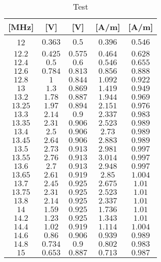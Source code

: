 \documentclass[12pt,a4paper,ngerman]{article}
\begin{document}
\begin{table}[H]
\begin{center}
\begin{tabular}{ |c|c|c|c|c| }
  [MHz] & [V] & [V] & [A/m] & [A/m] \\
  \hline
  12 & $0.363$ & $0.5$ & $0.396$ & $0.546$ \\
  \hline
  $12.2$ & $0.425$ & $0.575$ & $0.464$ & $0.628$ \\
  \hline
  $12.4$ & $0.5$ & $0.6$ & $0.546$ & $0.655$ \\
  \hline
  $12.6$ & $0.784$ & $0.813$ & $0.856$ & $0.888$ \\
    \hline
  $12.8$ & $1$ & $0.844$ & $1.092$ & $0.922$ \\
    \hline
  $13$ & $1.3$ & $0.869$ & $1.419$ & $0.949$ \\
    \hline
  $13.2$ & $1.78$ & $0.887$ & $1.944$ & $0.969$ \\
     \hline
  $13.25$ & $1.97$ & $0.894$ & $2.151$ & $0.976$ \\ 
    \hline
  $13.3$ & $2.14$ & $0.9$ & $2.337$ & $0.983$ \\
    \hline
  $13.35$ & $2.31$ & $0.906$ & $2.523$ & $0.989$ \\
    \hline
  $13.4$ & $2.5$ & $0.906$ & $2.73$ & $0.989$ \\
    \hline
  $13.45$ & $2.64$ & $0.906$ & $2.883$ & $0.989$ \\
    \hline
  $13.5$ & $2.73$ & $0.913$ & $2.981$ & $0.997$ \\
     \hline
  $13.55$ & $2.76$ & $0.913$ & $3.014$ & $0.997$ \\
      \hline
  $13.6$ & $2.7$ & $0.913$ & $2.948$ & $0.997$ \\ 
      \hline
  $13.65$ & $2.61$ & $0.919$ & $2.85$ & $1.004$ \\
      \hline
  $13.7$ & $2.45$ & $0.925$ & $2.675$ & $1.01$ \\
      \hline
  $13.75$ & $2.31$ & $0.925$ & $2.523$ & $1.01$ \\
      \hline
  $13.8$ & $2.14$ & $0.925$ & $2.337$ & $1.01$ \\
      \hline
  $14$ & $1.59$ & $0.925$ & $1.736$ & $1.01$ \\
      \hline
  $14.2$ & $1.23$ & $0.925$ & $1.343$ & $1.01$ \\
      \hline
  $14.4$ & $1.02$ & $0.919$ & $1.114$ & $1.004$ \\
      \hline
  $14.6$ & $0.86$ & $0.906$ & $0.939$ & $0.989$ \\
      \hline
  $14.8$ & $0.734$ & $0.9$ & $0.802$ & $0.983$ \\
      \hline
  $15$ & $0.653$ & $0.887$ & $0.713$ & $0.987$ \\
      \hline
\end{tabular}
\caption{Test}
\end{center}
\end{table}
\end{document}

